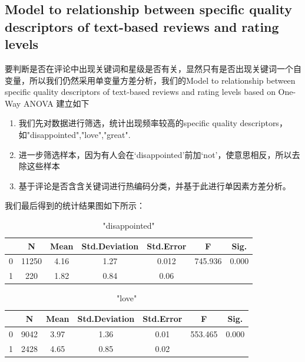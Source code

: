 \documentclass{mcmthesis}
\begin{document}
\subsection{Model to relationship between specific quality descriptors of text-based reviews and rating levels}
要判断是否在评论中出现关键词和星级是否有关，显然只有是否出现关键词一个自变量，所以我们仍然采用单变量方差分析，我们的Model to relationship between specific quality descriptors of text-based reviews and rating levels based on One-Way ANOVA 建立如下\\
\begin{enumerate}
	\item 我们先对数据进行筛选，统计出现频率较高的specific quality descriptors，如"disappointed","love","great".
	\item 进一步筛选样本，因为有人会在‘disappointed’前加‘not’，使意思相反，所以去除这些样本
	\item 基于评论是否含含关键词进行热编码分类，并基于此进行单因素方差分析。
\end{enumerate}
我们最后得到的统计结果图如下所示：\\
\begin{table}[htb]
	\center
	\caption{"disappointed"}
	\label{type}
	\begin{tabular}{c|c|c|c|c|c|c}
		\hline
		\textbf{} & \textbf{N} & \textbf{Mean}& \textbf{Std.Deviation}& \textbf{Std.Error}& \textbf{F}& \textbf{Sig.} \\ \hline 
		0        & 11250             & 4.16           & 1.27         & 0.012    & 745.936 & 0.000    \\
		1          & 220          & 1.82           & 0.84         & 0.06    &  & \\ \hline

	\end{tabular}
\end{table}
\begin{table}[htb]
	\center
	\caption{"love"}
	\label{type}
	\begin{tabular}{c|c|c|c|c|c|c}
		\hline
		\textbf{} & \textbf{N} & \textbf{Mean}& \textbf{Std.Deviation}& \textbf{Std.Error}& \textbf{F}& \textbf{Sig.} \\ \hline 
		0        & 9042             & 3.97           & 1.36         & 0.01    & 553.465 & 0.000    \\
		1          & 2428          & 4.65           & 0.85         & 0.02    &  & \\ \hline

	\end{tabular}
\end{table}
\end{document}

